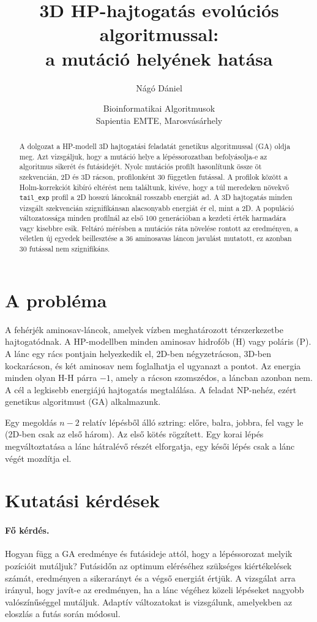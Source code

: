 \documentclass[11pt,a4paper]{article}
\title{3D HP-hajtogatás evolúciós algoritmussal:\\a mutáció helyének hatása}
\author{Nágó Dániel}
\date{Bioinformatikai Algoritmusok \\ Sapientia EMTE, Marosvásárhely}
\begin{document}
\maketitle

\begin{abstract}
\noindent A dolgozat a HP-modell 3D hajtogatási feladatát genetikus algoritmussal
(GA) oldja meg. Azt vizsgáljuk, hogy a mutáció helye a lépéssorozatban
befolyásolja-e az algoritmus sikerét és futásidejét. Nyolc mutációs profilt
hasonlítunk össze öt szekvencián, 2D és 3D rácson, profilonként 30 független
futással. A profilok között a Holm-korrekciót kibíró eltérést nem találtunk,
kivéve, hogy a túl meredeken növekvő \texttt{tail\_exp} profil a 2D hosszú
láncoknál rosszabb energiát ad. A 3D hajtogatás minden vizsgált szekvencián
szignifikánsan alacsonyabb energiát ér el, mint a 2D. A populáció változatossága
minden profilnál az első 100 generációban a kezdeti érték harmadára vagy kisebbre
esik. Feltáró mérésben a mutációs ráta növelése rontott az eredményen, a véletlen
új egyedek beillesztése a 36 aminosavas láncon javulást mutatott, ez azonban 30
futással nem szignifikáns.
\end{abstract}

\section{A probléma}

A fehérjék aminosav-láncok, amelyek vízben meghatározott térszerkezetbe
hajtogatódnak. A HP-modellben minden aminosav hidrofób (H) vagy poláris (P).
A lánc egy rács pontjain helyezkedik el, 2D-ben négyzetrácson, 3D-ben
kockarácson, és két aminosav nem foglalhatja el ugyanazt a pontot. Az energia
minden olyan H-H párra $-1$, amely a rácson szomszédos, a láncban azonban nem. A
cél a legkisebb energiájú hajtogatás megtalálása. A feladat NP-nehéz, ezért
genetikus algoritmust (GA) alkalmazunk.

Egy megoldás $n-2$ relatív lépésből álló sztring: előre, balra, jobbra, fel vagy
le (2D-ben csak az első három). Az első kötés rögzített. Egy korai lépés
megváltoztatása a lánc hátralévő részét elforgatja, egy késői lépés csak a lánc
végét mozdítja el.

\section{Kutatási kérdések}

\paragraph{Fő kérdés.} Hogyan függ a GA eredménye és futásideje attól, hogy a
lépéssorozat melyik pozícióit mutáljuk? Futásidőn az optimum eléréséhez szükséges
kiértékelések számát, eredményen a sikerarányt és a végső energiát értjük. A
vizsgálat arra irányul, hogy javít-e az eredményen, ha a lánc végéhez közeli
lépéseket nagyobb valószínűséggel mutáljuk. Adaptív változatokat is vizsgálunk, amelyekben
az eloszlás a futás során módosul.
\end{document}
